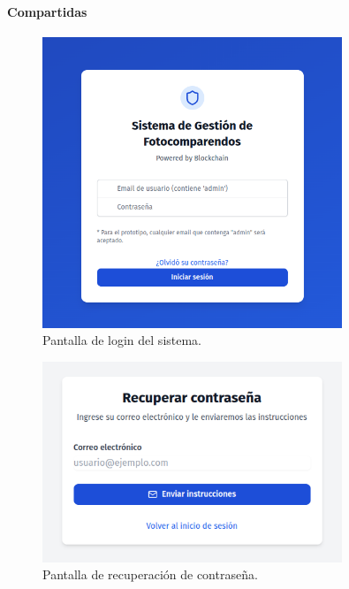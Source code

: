 \documentclass[
    letterpaper, 
    man,   
    spanish,
    12pt,
    donotrepeattitle,
    floatsintext,
    hidelinks %
]{apa7}
\begin{document}
\paragraph{Compartidas}
 \begin{figure}[htbp]
    \centering
    \includegraphics[width=0.8\textwidth]{Images/UI1.png}
    \caption{Pantalla de login del sistema.}
    \label{fig:login}
\end{figure}

 \begin{figure}[htbp]
    \centering
    \includegraphics[width=0.8\textwidth]{Images/UI2.png}
    \caption{Pantalla de recuperación de contraseña.}
    \label{fig:recuperar_password}
\end{figure}
\end{document}
